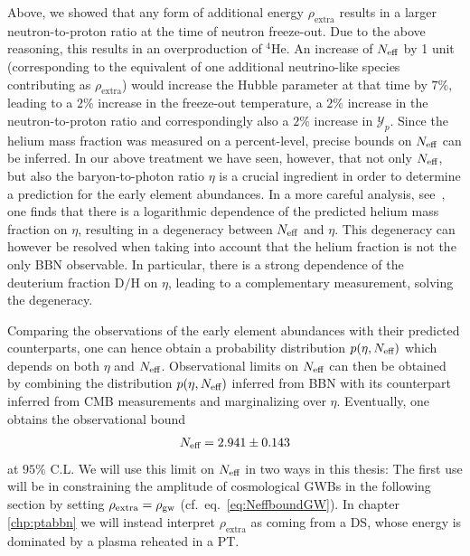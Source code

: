 Above, we showed that any form of additional energy $\rho_\text{extra}$ results in a larger neutron-to-proton ratio at the time of neutron freeze-out. Due to the above reasoning, this results in an overproduction of ${}^4 \text{He}$. An increase of $N_\text{eff}$ by 1 unit (corresponding to the equivalent of one additional neutrino-like species contributing as $\rho_\text{extra}$) would increase the Hubble parameter at that time by $7\%$, leading to a $2\%$ increase in the freeze-out temperature, a $2\%$ increase in the neutron-to-proton ratio and correspondingly also a $2 \%$ increase in $\mathcal{Y}_p$. Since the helium mass fraction was measured on a percent-level, precise bounds on $N_\text{eff}$ can be inferred. In our above treatment we have seen, however, that not only $N_\text{eff}$, but also the baryon-to-photon ratio $\eta$ is a crucial ingredient in order  to determine a prediction for the early element abundances.  In a more careful analysis, see~\cite{Baumann:2022mni}, one finds that there is a logarithmic dependence of the predicted helium mass fraction on $\eta$, resulting in a degeneracy between $N_\text{eff}$ and $\eta$. This degeneracy can however be resolved when taking into account that the helium fraction is not the only \ac{BBN} observable. In particular, there is a strong dependence of the deuterium fraction $\text{D}/\text{H}$ on $\eta$, leading to a complementary measurement, solving the degeneracy.

Comparing the observations of the early element abundances with their predicted counterparts, one can hence obtain a probability distribution $p(\eta, N_\text{eff})$ which depends on both $\eta$ and $N_\text{eff}$. Observational limits on $N_\text{eff}$ can then be obtained by combining the distribution $p(\eta, N_\text{eff})$ inferred from \ac{BBN} with its counterpart inferred from \ac{CMB} measurements and marginalizing over $\eta$. Eventually, one obtains the observational bound~\cite{Yeh:2022heq}
\begin{align}
	N_\text{eff} = 2.941 \pm 0.143 \label{eq:BBNCMBNeff}
\end{align}
at $95\%$ C.L. We will use this limit on $N_\text{eff}$ in two ways in this thesis: The first use will be in constraining the amplitude of cosmological \acp{GWB} in the following section by setting $\rho_\text{extra} = \rho_{\text{gw}}$ (cf.~eq.~\eqref{eq:NeffboundGW}). In chapter \ref{chp:ptabbn} we will instead interpret $\rho_\text{extra}$ as coming from a \ac{DS}, whose energy is dominated by a plasma reheated in a \ac{PT}.


